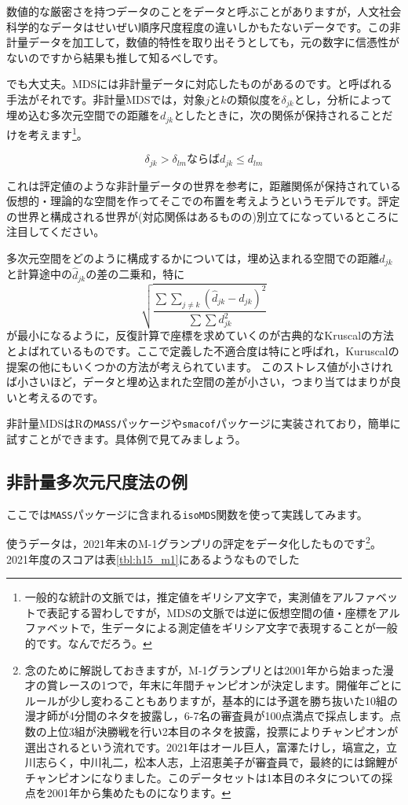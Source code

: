 \documentclass{ltjsbook}
\begin{document}
数値的な厳密さを持つデータのことをデータと呼ぶことがありますが，人文社会科学的なデータはせいぜい順序尺度程度の違いしかもたないデータです。この非計量データを加工して，数値的特性を取り出そうとしても，元の数字に信憑性がないのですから結果も推して知るべしです。

でも大丈夫。MDSには非計量データに対応したものがあるのです。と呼ばれる手法がそれです。非計量MDSでは，対象$j$と$k$の類似度を$\delta_{jk}$とし，分析によって埋め込む多次元空間での距離を$d_{jk}$としたときに，次の関係が保持されることだけを考えます\footnote{一般的な統計の文脈では，推定値をギリシア文字で，実測値をアルファベットで表記する習わしですが，MDSの文脈では逆に仮想空間の値・座標をアルファベットで，生データによる測定値をギリシア文字で表現することが一般的です。なんでだろう。}。

$$ \delta_{jk} > \delta_{lm} \mbox{ならば}d_{jk}\le d_{lm} $$

これは評定値のような非計量データの世界を参考に，距離関係が保持されている仮想的・理論的な空間を作ってそこでの布置を考えようというモデルです。評定の世界と構成される世界が(対応関係はあるものの)別立てになっているところに注目してください。

多次元空間をどのように構成するかについては，埋め込まれる空間での距離$d_{jk}$と計算途中の$\hat{d}_{jk}$の差の二乗和，特に
\[ \sqrt{\frac{\sum \sum_{j\neq k}(\hat{d}_{jk}-d_{jk})^2}{\sum \sum d_{jk}^2}} \]
が最小になるように，反復計算で座標を求めていくのが古典的なKruscalの方法とよばれているものです\citep{kruskal1964}。ここで定義した不適合度は特にと呼ばれ，Kuruscalの提案の他にもいくつかの方法が考えられています。
このストレス値が小さければ小さいほど，データと埋め込まれた空間の差が小さい，つまり当てはまりが良いと考えるのです。

非計量MDSはRの\verb|MASS|パッケージや\verb|smacof|パッケージに実装されており，簡単に試すことができます。具体例で見てみましょう。

\subsection{非計量多次元尺度法の例}

ここでは\verb|MASS|パッケージに含まれる\verb|isoMDS|関数を使って実践してみます。

使うデータは，2021年末のM-1グランプリの評定をデータ化したものです\footnote{念のために解説しておきますが，M-1グランプリとは2001年から始まった漫才の賞レースの1つで，年末に年間チャンピオンが決定します。開催年ごとにルールが少し変わることもありますが，基本的には予選を勝ち抜いた10組の漫才師が4分間のネタを披露し，6-7名の審査員が100点満点で採点します。点数の上位3組が決勝戦を行い2本目のネタを披露，投票によりチャンピオンが選出されるという流れです。2021年はオール巨人，富澤たけし，塙宣之，立川志らく，中川礼二，松本人志，上沼恵美子が審査員で，最終的には錦鯉がチャンピオンになりました。このデータセットは1本目のネタについての採点を2001年から集めたものになります。}。2021年度のスコアは表\ref{tbl:h15_m1}にあるようなものでした
\end{document}
